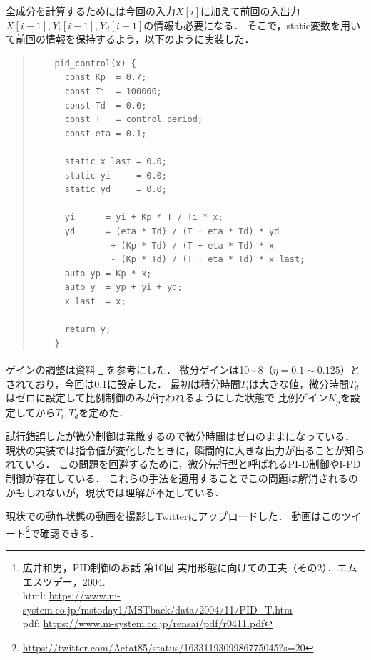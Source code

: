 \documentclass[a4paper]{jlreq}
\begin{document}
全成分を計算するためには今回の入力$X[i]$に加えて前回の入出力$X[i-1], Y_i[i-1], Y_d[i-1]$の情報も必要になる．
そこで，static変数を用いて前回の情報を保持するよう，以下のように実装した．

\begin{quote}
  \setlength{\baselineskip}{12pt}
  \begin{verbatim}
    pid_control(x) {
      const Kp  = 0.7;
      const Ti  = 100000;
      const Td  = 0.0;
      const T   = control_period;
      const eta = 0.1;

      static x_last = 0.0;
      static yi     = 0.0;
      static yd     = 0.0;

      yi      = yi + Kp * T / Ti * x;
      yd      = (eta * Td) / (T + eta * Td) * yd
               + (Kp * Td) / (T + eta * Td) * x
               - (Kp * Td) / (T + eta * Td) * x_last;
      auto yp = Kp * x;
      auto y  = yp + yi + yd;
      x_last  = x;

      return y;
    }
  \end{verbatim}
\end{quote}

ゲインの調整は資料
\footnote{広井和男，PID制御のお話 第10回 実用形態に向けての工夫（その2）．エムエスツデー，2004. \\
html: \url{https://www.m-system.co.jp/mstoday1/MSTback/data/2004/11/PID_T.htm} \\
pdf: \url{https://www.m-system.co.jp/rensai/pdf/r0411.pdf}}
を参考にした．
微分ゲインは10\,\sim\,8（$\eta=0.1 \sim 0.125$）とされており，今回は0.1に設定した．
最初は積分時間$T_i$は大きな値，微分時間$T_d$はゼロに設定して比例制御のみが行われるようにした状態で
比例ゲイン$K_p$を設定してから$T_i, T_d$を定めた．

試行錯誤したが微分制御は発散するので微分時間はゼロのままになっている．
現状の実装では指令値が変化したときに，瞬間的に大きな出力が出ることが知られている．
この問題を回避するために，微分先行型と呼ばれるPI-D制御やI-PD制御が存在している．
これらの手法を適用することでこの問題は解消されるのかもしれないが，現状では理解が不足している．

現状での動作状態の動画を撮影しTwitterにアップロードした．
動画はこのツイート\footnote{\url{https://twitter.com/Actat85/status/1633119309986775045?s=20}}で確認できる．
\end{document}
